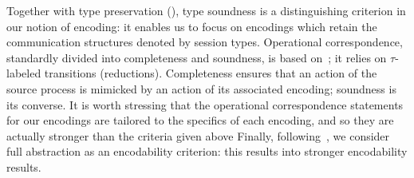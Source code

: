 \smallskip 

\noi Together with type preservation (), type soundness is a distinguishing criterion in our notion of encoding: it enables us to focus on encodings which retain the communication structures denoted by session types.
Operational correspondence, standardly divided into completeness and soundness, is based
on~\cite{DBLP:journals/iandc/Gorla10,DBLP:conf/icalp/LanesePSS10};
it relies on 
$\tau$-labeled transitions (reductions).
Completeness ensures that an action of the source process is mimicked
by an action of its associated encoding; soundness is its converse.
It is worth stressing that 
the operational correspondence statements 
for our encodings 
 are tailored to the specifics of each encoding, and so they
 are actually stronger than the criteria given above
Finally, following~\cite{SangiorgiD:expmpa,DBLP:conf/lics/PalamidessiSVV06,Yoshida96},
we consider full abstraction as an encodability criterion: this results into 
stronger encodability results. 

%
%

